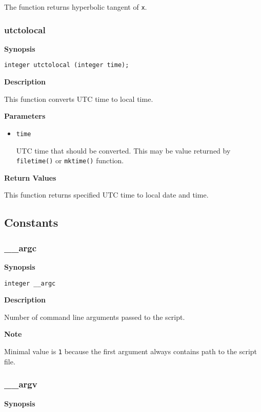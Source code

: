 \documentclass[a4paper, 10pt, titlepage]{article}
\begin{document}
The function returns hyperbolic tangent of \texttt{x}.

\subsubsection{utctolocal}

\textbf{Synopsis}

\begin{verbatim}
integer utctolocal (integer time);
\end{verbatim}

\textbf{Description}

This function converts UTC time to local time.

\textbf{Parameters}

\begin{itemize}
\item \texttt{time}

UTC time that should be converted. This may be value returned by \texttt{filetime()} or \texttt{mktime()} function.
\end{itemize}

\textbf{Return Values}

This function returns specified UTC time to local date and time.

\subsection{Constants}

\subsubsection{\_\_argc}

\textbf{Synopsis}

\begin{verbatim}
integer __argc
\end{verbatim}

\textbf{Description}

Number of command line arguments passed to the script.

\textbf{Note}

Minimal value is \texttt{1} because the first argument always contains path to the script file.

\subsubsection{\_\_argv}

\textbf{Synopsis}
\end{document}
